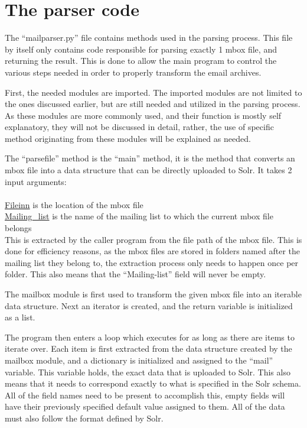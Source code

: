 \documentclass[a4paper,english]{report}
\begin{document}
\section{The parser code} 


The “mailparser.py” file contains methods used in the parsing process. This file by itself only contains code responsible for parsing exactly 1 mbox file, and returning the result. This is done to allow the main program to control the various steps needed in order to properly transform the email archives. 

First, the needed modules are imported. The imported modules are not limited to the ones discussed earlier, but are still needed and utilized in the parsing process. As these modules are more commonly used, and their function is mostly self explanatory, they will not be discussed in detail, rather, the use of specific method originating from these modules will be explained as needed. 





The “parsefile” method is the “main” method, it is the method that converts an mbox file into a data structure that can be directly uploaded to Solr. It takes 2 input arguments:\\\\
\url{Fileinn} is the location of the mbox file\\
\url{Mailing_list} is the name of the mailing list to which the current mbox file belongs\\
 
This is extracted by the caller program from the file path of the mbox file. This is done for efficiency reasons, as the mbox files are stored in folders named after the mailing list they belong to, the extraction process only needs to happen once per folder. This also means that the “Mailing-list” field will never be empty.  
 
The mailbox module is first used to transform the given mbox file into an iterable data structure.
Next an iterator is created, and the return variable is initialized as a list.




The program then enters a loop which executes for as long as there are items to iterate over.
Each item is first extracted from the data structure created by the mailbox module, and a dictionary is initialized and assigned to the “mail” variable. This variable holds, the exact data that is uploaded to Solr. This also means that it needs to correspond exactly to what is specified in the Solr schema. All of the field names need to be present to accomplish this, empty fields will have their previously specified default value assigned to them.
 All of the data must also follow the format defined by Solr.
\end{document}

